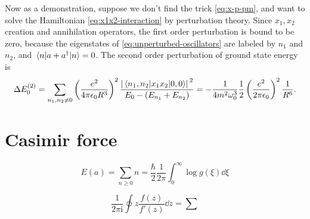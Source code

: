 \documentclass[hyperref, a4paper]{article}
\newcommand*{\ii}{\mathrm{i}}
\begin{document}
Now as a demonstration, suppose we don't find the trick \eqref{eq:x-p-pm}, 
and want to solve the Hamiltonian \eqref{eq:x1x2-interaction}
by perturbation theory.
Since $x_1, x_2$ creation and annihilation operators,
the first order perturbation is bound to be zero, 
because the eigenstates of \eqref{eq:unperturbed-oscillators}
are labeled by $n_1$ and $n_2$, 
and $\mel{n}{a+a^\dagger}{n} = 0$.
The second order perturbation of ground state energy is 
\begin{equation}
    \Delta E_0^{(2)} = \sum_{n_1, n_2 \neq 0} 
    \left(\frac{e^2}{4 \pi \epsilon_0 R^3}\right)^2 \frac{
        \abs*{\mel{n_1, n_2}{x_1 x_2}{0, 0}}^2
    }{
        E_0 - (E_{n_1} + E_{n_2})
    } = - \frac{1}{4 m^2 \omega_0^3} \frac{1}{2} \left(\frac{e^2}{2 \pi \epsilon_0}\right)^2 \frac{1}{R^6}.
\end{equation}

\section{Casimir force}

\begin{equation}
    E(a) = \sum_{n \geq 0} n = \frac{\hbar}{2} \frac{1}{2\pi} \int_{0}^{\infty} \log g(\xi) \dd{\xi}
\end{equation}

\begin{equation}
    \frac{1}{2\pi \ii} \oint z \frac{f(z)}{f'(z)} \dd{z} = \sum
\end{equation}
\end{document}
